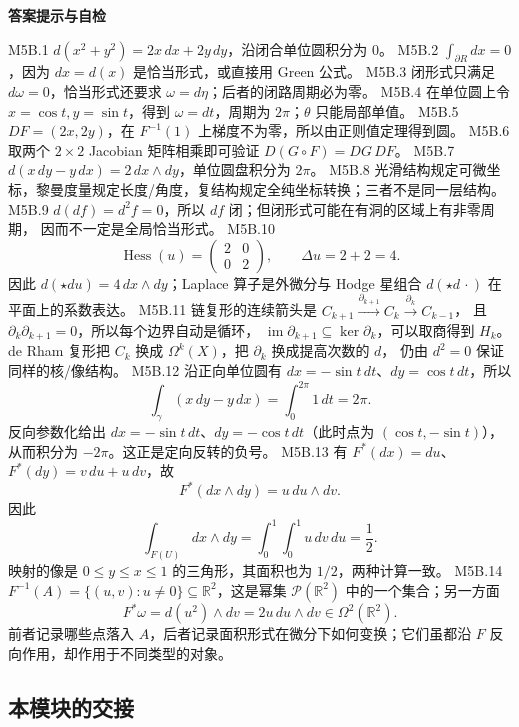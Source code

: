 \documentclass[UTF8,fontset=none,a4paper,11pt]{ctexart}
\theoremstyle{foundation-definition}
\theoremstyle{foundation-theorem}
\theoremstyle{foundation-proposition}
\theoremstyle{foundation-example}
\theoremstyle{foundation-remark}
\theoremstyle{foundation-theorem}
\newenvironment{answerkey}{%
\begin{mdframed}[backgroundcolor=examplebg,linecolor=examplepurple,linewidth=1.0pt,
  leftline=true,rightline=false,topline=false,bottomline=false,
  skipabove=7pt,skipbelow=8pt,innerleftmargin=10pt,innerrightmargin=8pt,
  innertopmargin=6pt,innerbottommargin=6pt]
{\sffamily\bfseries\color{examplepurple}答案提示与自检}\par\smallskip\small
}{\end{mdframed}}
\begin{document}
\begin{answerkey}
M5B.1 \(d(x^2+y^2)=2x\,dx+2y\,dy\)，沿闭合单位圆积分为 \(0\)。
M5B.2 \(\int_{\partial R}dx=0\)，因为 \(dx=d(x)\) 是恰当形式，或直接用 Green 公式。
M5B.3 闭形式只满足 \(d\omega=0\)，恰当形式还要求 \(\omega=d\eta\)；后者的闭路周期必为零。
M5B.4 在单位圆上令 \(x=\cos t,y=\sin t\)，得到 \(\omega=dt\)，周期为 \(2\pi\)；\(\theta\) 只能局部单值。
M5B.5 \(DF=(2x,2y)\)，在 \(F^{-1}(1)\) 上梯度不为零，所以由正则值定理得到圆。
M5B.6 取两个 \(2\times2\) Jacobian 矩阵相乘即可验证 \(D(G\circ F)=DG\,DF\)。
M5B.7 \(d(x\,dy-y\,dx)=2\,dx\wedge dy\)，单位圆盘积分为 \(2\pi\)。
M5B.8 光滑结构规定可微坐标，黎曼度量规定长度/角度，复结构规定全纯坐标转换；三者不是同一层结构。
M5B.9 \(d(df)=d^2f=0\)，所以 \(df\) 闭；但闭形式可能在有洞的区域上有非零周期，
    因而不一定是全局恰当形式。
M5B.10
\[
\operatorname{Hess}(u)=\begin{pmatrix}2&0\\0&2\end{pmatrix},
\qquad
\Delta u=2+2=4.
\]
因此 \(d(\star du)=4\,dx\wedge dy\)；Laplace 算子是外微分与 Hodge 星组合
\(d(\star d\,\cdot)\) 在平面上的系数表达。
M5B.11 链复形的连续箭头是
\(C_{k+1}\xrightarrow{\partial_{k+1}}C_k\xrightarrow{\partial_k}C_{k-1}\)，
且 \(\partial_k\partial_{k+1}=0\)，所以每个边界自动是循环，
\(\operatorname{im}\partial_{k+1}\subseteq\ker\partial_k\)，可以取商得到 \(H_k\)。
de Rham 复形把 \(C_k\) 换成 \(\Omega^k(X)\)，把 \(\partial_k\) 换成提高次数的 \(d\)，
仍由 \(d^2=0\) 保证同样的核/像结构。
M5B.12 沿正向单位圆有 \(dx=-\sin t\,dt\)、\(dy=\cos t\,dt\)，所以
\[
\int_\gamma(x\,dy-y\,dx)=\int_0^{2\pi}1\,dt=2\pi.
\]
反向参数化给出 \(dx= -\sin t\,dt\)、\(dy=-\cos t\,dt\)（此时点为
\((\cos t,-\sin t)\)），从而积分为 \(-2\pi\)。这正是定向反转的负号。
M5B.13 有 \(F^*(dx)=du\)、\(F^*(dy)=v\,du+u\,dv\)，故
\[
F^*(dx\wedge dy)=u\,du\wedge dv.
\]
因此
\[
\int_{F(U)}dx\wedge dy=\int_0^1\int_0^1u\,dv\,du=\frac12.
\]
映射的像是 \(0\leq y\leq x\leq1\) 的三角形，其面积也为 \(1/2\)，两种计算一致。
M5B.14 \(F^{-1}(A)=\{(u,v):u\ne0\}\subseteq\mathbb R^2\)，这是幂集
\(\mathcal P(\mathbb R^2)\) 中的一个集合；另一方面
\[
F^*\omega=d(u^2)\wedge dv=2u\,du\wedge dv\in\Omega^2(\mathbb R^2).
\]
前者记录哪些点落入 \(A\)，后者记录面积形式在微分下如何变换；它们虽都沿
\(F\) 反向作用，却作用于不同类型的对象。
\end{answerkey}

\subsection{本模块的交接}
\end{document}

